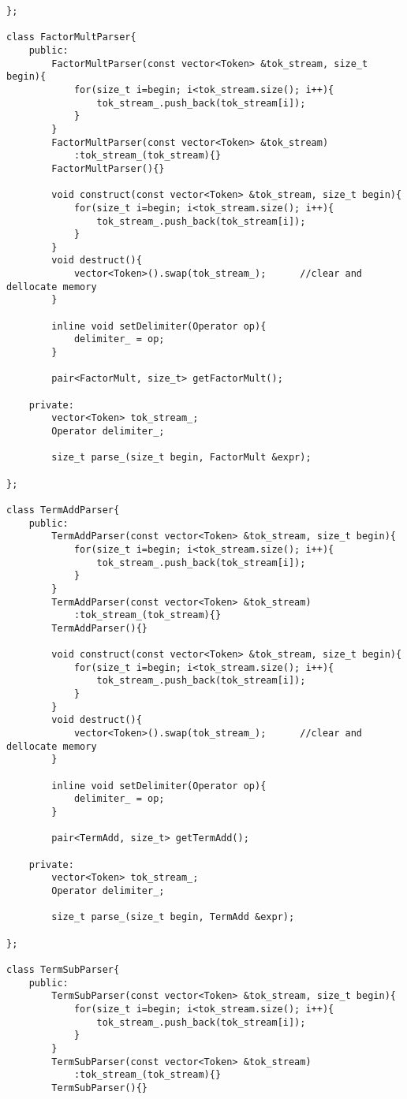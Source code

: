 \documentclass[pdftex,12pt,letterpaper,notitlepage,twoside]{article}
\begin{document}
\begin{lstlisting}[frame=single,caption={C program for testing}]
};

class FactorMultParser{
    public:
        FactorMultParser(const vector<Token> &tok_stream, size_t begin){
            for(size_t i=begin; i<tok_stream.size(); i++){
                tok_stream_.push_back(tok_stream[i]);
            }
        }
        FactorMultParser(const vector<Token> &tok_stream)
            :tok_stream_(tok_stream){}
        FactorMultParser(){}

        void construct(const vector<Token> &tok_stream, size_t begin){
            for(size_t i=begin; i<tok_stream.size(); i++){
                tok_stream_.push_back(tok_stream[i]);
            }
        }
        void destruct(){
            vector<Token>().swap(tok_stream_);      //clear and dellocate memory
        }

        inline void setDelimiter(Operator op){
            delimiter_ = op;
        }

        pair<FactorMult, size_t> getFactorMult();

    private:
        vector<Token> tok_stream_;
        Operator delimiter_;

        size_t parse_(size_t begin, FactorMult &expr);

};

class TermAddParser{
    public:
        TermAddParser(const vector<Token> &tok_stream, size_t begin){
            for(size_t i=begin; i<tok_stream.size(); i++){
                tok_stream_.push_back(tok_stream[i]);
            }
        }
        TermAddParser(const vector<Token> &tok_stream)
            :tok_stream_(tok_stream){}
        TermAddParser(){}

        void construct(const vector<Token> &tok_stream, size_t begin){
            for(size_t i=begin; i<tok_stream.size(); i++){
                tok_stream_.push_back(tok_stream[i]);
            }
        }
        void destruct(){
            vector<Token>().swap(tok_stream_);      //clear and dellocate memory
        }

        inline void setDelimiter(Operator op){
            delimiter_ = op;
        }

        pair<TermAdd, size_t> getTermAdd();

    private:
        vector<Token> tok_stream_;
        Operator delimiter_;

        size_t parse_(size_t begin, TermAdd &expr);

};

class TermSubParser{
    public:
        TermSubParser(const vector<Token> &tok_stream, size_t begin){
            for(size_t i=begin; i<tok_stream.size(); i++){
                tok_stream_.push_back(tok_stream[i]);
            }
        }
        TermSubParser(const vector<Token> &tok_stream)
            :tok_stream_(tok_stream){}
        TermSubParser(){}


\end{lstlisting}
\end{document}
